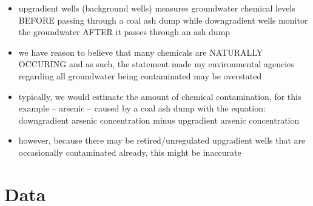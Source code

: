 \documentclass[12pt, twoside]{amherstthesis}
\begin{document}
\begin{itemize}
\item
  upgradient wells (background wells) measures groundwater chemical levels BEFORE passing through a coal ash dump while downgradient wells monitor the groundwater AFTER it passes through an ash dump
\item
  we have reason to believe that many chemicals are NATURALLY OCCURING and as such, the statement made my environmental agencies regarding all groundwater being contaminated may be overstated
\item
  typically, we would estimate the amount of chemical contamination, for this example -- arsenic -- caused by a coal ash dump with the equation: downgradient arsenic concentration minus upgradient arsenic concentration
\item
  however, because there may be retired/unregulated upgradient wells that are occasionally contaminated already, this might be inaccurate
\end{itemize}
\hypertarget{data}{%
\section{Data}\label{data}}
\end{document}
